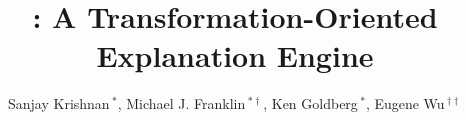 \documentclass{sig-alternate}
\begin{document}
\newcommand{\reminder}[1]{{{\textcolor{magenta}{\{\{\bf #1\}\}}}\xspace}}
\newcommand{\ewu}[1]{{{\textcolor{blue}{\{\{\bf ewu:\} #1\}}}\xspace}}
\newcommand{\mps}[1]{{{\textcolor{red}{\{\{\bf meelap:\} #1\}}}\xspace}}
\newcommand{\stitle}[1]{\smallskip\noindent\textbf{#1: }}
\newcommand{\ititle}[1]{\smallskip\noindent\textit{#1: }}
\newcommand{\btitle}[1]{\smallskip\noindent\textbf{#1}}



\newcommand{\white}[1]{{\textcolor{white}{#1}\xspace}}
\newcommand{\blue}[1]{{\textcolor{blue}{{\bf #1}}\xspace}}
\newcommand{\orange}[1]{{\textcolor{orange}{{\bf #1}}\xspace}}
\newcommand{\pop}[1]{{\textcolor{pop}{{\textit{\textbf{#1}}}}\xspace}}
\newcommand{\red}[1]{\textcolor{red}{#1}}
\newcommand{\green}[1]{\textcolor{green}{#1}}
\newcommand{\gray}[1]{\textcolor{light-gray}{#1}}




\newcommand{\specialcell}[2][c]{%
  \begin{tabular}[#1]{@{}c@{}}#2\end{tabular}}

\def\ojoin{\setbox0=\hbox{$\bowtie$}%
  \rule[-.02ex]{.25em}{.4pt}\llap{\rule[\ht0]{.25em}{.4pt}}}
\def\leftouterjoin{\mathbin{\ojoin\mkern-5.8mu\bowtie}}
\def\rightouterjoin{\mathbin{\bowtie\mkern-5.8mu\ojoin}}
\def\fullouterjoin{\mathbin{\ojoin\mkern-5.8mu\bowtie\mkern-5.8mu\ojoin}}


\pagestyle{plain}

%

\title{\sys: A Transformation-Oriented Explanation Engine}

\author{ Sanjay Krishnan$\,^{*}$, Michael J. Franklin$\,^{*\dag}$, Ken Goldberg$\,^{*}$, Eugene Wu{$\,^{\dag\dag}$}  \\
 \\
\\
\affaddr{}
}
\end{document}
